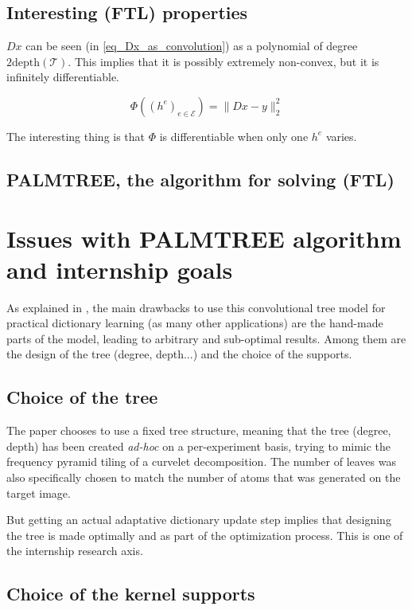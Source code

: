 \subsection{Interesting (FTL) properties}
$Dx$ can be seen (in \cref{eq_Dx_as_convolution}) as a polynomial of degree $2\text{depth}(\mathcal{T})$. This implies that it is possibly extremely non-convex, but it is infinitely differentiable.

$$\Phi((h^e)_{e \in \mathcal{E}}) = \lVert Dx-y \rVert^2_2$$

The interesting thing is that $\Phi$ is differentiable when only one $h^e$ varies. %


\subsection{PALMTREE, the algorithm for solving (FTL)}

\section{Issues with PALMTREE algorithm and internship goals}
As explained in \cite[p. 23]{chabiron_optimization_2016}, the main drawbacks to use this convolutional tree model for practical dictionary learning (as many other applications) are the hand-made parts of the model, leading to arbitrary and sub-optimal results. Among them are the design of the tree (degree, depth...) and the choice of the supports. %
\subsection{Choice of the tree}
The paper chooses to use a fixed tree structure, meaning that the tree (degree, depth) has been created \emph{ad-hoc} on a per-experiment basis, trying to mimic the frequency pyramid tiling of a curvelet decomposition. The number of leaves was also specifically chosen to match the number of atoms that was generated on the target image.

But getting an actual adaptative dictionary update step implies that designing the tree is made optimally and as part of the optimization process. This is one of the internship research axis.

\subsection{Choice of the kernel supports}


